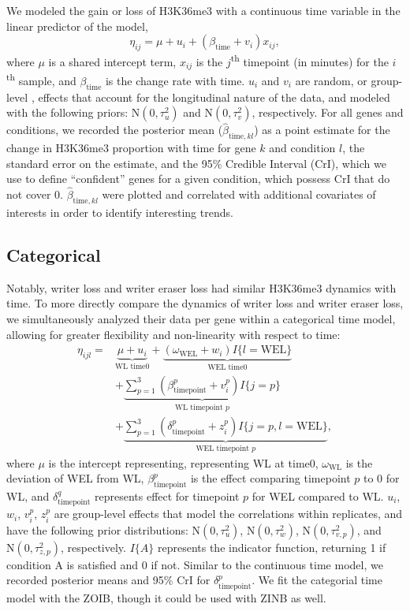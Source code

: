 \documentclass[12pt]{extarticle}
\begin{document}
We modeled the gain or loss of H3K36me3 with a continuous time variable in the linear predictor of the model, 
\begin{equation}
	\eta_{ij} = \mu + u_{i} + (\beta_{\text{time}} + v_{i})x_{ij},
\end{equation}
where $\mu$ is a shared intercept term, $x_{ij}$ is the $j$\textsuperscript{th} timepoint (in minutes) for the $i$\textsuperscript{th} sample, and $\beta_{\text{time}}$ is the change rate with time. $u_{i}$ and $v_{i}$ are random, or group-level \cite{Gelman2006}, effects that account for the longitudinal nature of the data, and modeled with the following priors: $\text{N}(0, \tau^{2}_{u})$ and $\text{N}(0, \tau^{2}_{v})$, respectively. For all genes and conditions, we recorded the posterior mean ($\widehat{\beta}_{\text{time}, kl}$) as a point estimate for the change in H3K36me3 proportion with time for gene $k$ and condition $l$, the standard error on the estimate, and the 95\% Credible Interval (CrI), which we use to define ``confident'' genes for a given condition, which possess CrI that do not cover 0. $\widehat{\beta}_{\text{time}, kl}$ were plotted and correlated with additional covariates of interests in order to identify interesting trends.

\subsection*{Categorical}

Notably, writer loss and writer eraser loss had similar H3K36me3 dynamics with time. To more directly compare the dynamics of writer loss and writer eraser loss, we simultaneously analyzed their data per gene within a categorical time model, allowing for greater flexibility and non-linearity with respect to time:
\begin{align}
	\eta_{ijl} = &\underbrace{\mu + u_{i}}_{\text{WL time0}} + \underbrace{(\omega_{\text{WEL}} + w_{i})I\{l = \text{WEL}\}}_{\text{WEL time0}} \\ 
	&+ \underbrace{\sum_{p = 1}^{3}(\beta_{\text{timepoint}}^{p} + v_{i}^{p})I\{j = p\}}_{\text{WL timepoint }p} \nonumber \\ 
	&+ \underbrace{\sum_{p = 1}^{3}(\delta_{\text{timepoint}}^{p} + z_{i}^{p})I\{j = p, l = \text{WEL}\}}_{\text{WEL timepoint }p},\nonumber
\end{align}
where $\mu$ is the intercept representing, representing WL at time0, $\omega_{\text{WL}}$ is the deviation of WEL from WL, $\beta_{\text{timepoint}}^{p}$ is the effect comparing timepoint $p$ to $0$ for WL, and $\delta_{\text{timepoint}}^{q}$ represents effect for timepoint $p$ for WEL compared to WL. $u_{i}$, $w_{i}$, $v_{i}^{p}$, $z_{i}^{p}$ are group-level effects that model the correlations within replicates, and have the following prior distributions: $\text{N}(0, \tau^{2}_{u})$, $\text{N}(0, \tau^{2}_{w})$, $\text{N}(0, \tau^{2}_{v,p})$, and $\text{N}(0, \tau^{2}_{z,p})$, respectively. $I\{A\}$ represents the indicator function, returning 1 if condition A is satisfied and 0 if not. Similar to the continuous time model, we recorded posterior means and 95\% CrI for $\delta_{\text{timepoint}}^{p}$. We fit the categorial time model with the ZOIB, though it could be used with ZINB as well.
\end{document}
